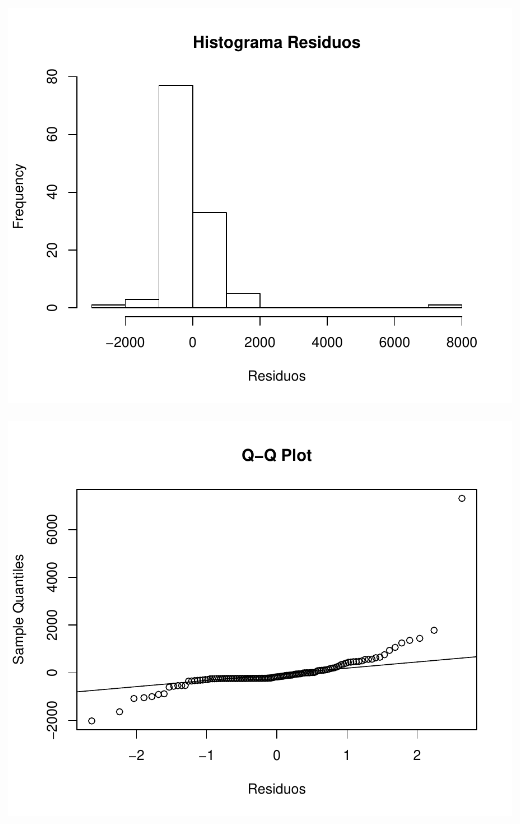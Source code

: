 \documentclass[11pt,a4paper,oneside]{article}\usepackage[]{graphicx}\usepackage[]{color}
\makeatletter
\def\maxwidth{ %
  \ifdim\Gin@nat@width>\linewidth
    \linewidth
  \else
    \Gin@nat@width
  \fi
}
\newenvironment{knitrout}{}{} %
\makeatother
\begin{document}
\begin{knitrout}
{\centering \includegraphics[width=\maxwidth]{figure/unnamed-chunk-16-59} 

}




{\centering \includegraphics[width=\maxwidth]{figure/unnamed-chunk-16-60} 

}





\end{knitrout}
\end{document}
